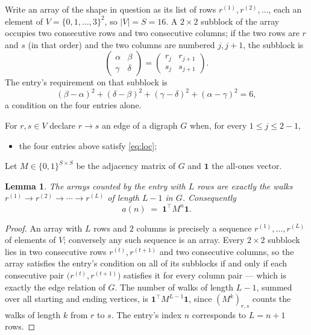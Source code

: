 \documentclass[11pt,a4paper]{article}
\theoremstyle{plain}
\newtheorem{lemma}[theorem]{Lemma}
\theoremstyle{definition}
\begin{document}
Write an array of the shape in question as its list of rows
$r^{(1)},r^{(2)},\dots$, each an element of
$V=\{0,1,\dots,3\}^{2}$, so $|V|=S=16$. A $2\times2$ subblock of the array
occupies two consecutive rows and two consecutive columns; if the two rows are $r$
and $s$ (in that order) and the two columns are numbered $j,j+1$,
the subblock is
\[
\begin{pmatrix}\alpha&\beta\\\gamma&\delta\end{pmatrix}=\begin{pmatrix}r_j&r_{j+1}\\s_j&s_{j+1}\end{pmatrix}.
\]
The entry's requirement on that subblock is
\begin{equation}\label{eq:loc}
(\beta-\alpha)^2+(\delta-\beta)^2+(\gamma-\delta)^2+(\alpha-\gamma)^2=6,
\end{equation}
a condition on the four entries alone.

For $r,s\in V$ declare $r\to s$ an edge of a digraph $G$ when, for every
$1\le j\le 2-1$,
\begin{itemize}
\item the four entries above satisfy \eqref{eq:loc};

\end{itemize}
Let $M\in\{0,1\}^{S\times S}$ be the adjacency matrix of $G$ and $\mathbf{1}$ the
all-ones vector.

\begin{lemma}\label{lem:walk}
The arrays counted by the entry with $L$ rows are exactly the walks
$r^{(1)}\to r^{(2)}\to\cdots\to r^{(L)}$ of length $L-1$ in $G$. Consequently
\[
a(n)\;=\;\mathbf{1}^{\!\top}M^{n}\mathbf{1} .
\]
\end{lemma}

\begin{proof}
An array with $L$ rows and $2$ columns is precisely a sequence
$r^{(1)},\dots,r^{(L)}$ of elements of $V$; conversely any such sequence is an array.
Every $2\times2$ subblock lies in two consecutive rows $r^{(t)},r^{(t+1)}$ and two
consecutive columns, so the array satisfies the entry's condition on all of its subblocks
if and only if each consecutive pair $\bigl(r^{(t)},r^{(t+1)}\bigr)$ satisfies it for
every column pair --- which is exactly the edge relation of $G$. The number of walks of
length $L-1$, summed over all starting and ending vertices, is
$\mathbf{1}^{\!\top}M^{L-1}\mathbf{1}$, since $(M^{k})_{r,s}$ counts the walks of
length $k$ from $r$ to $s$. The entry's index $n$ corresponds to $L=n+1$ rows.
\end{proof}
\end{document}
